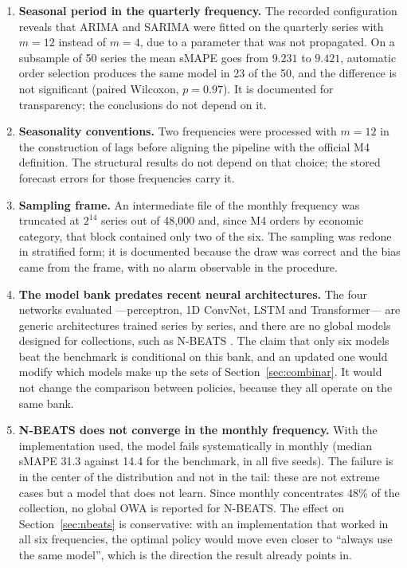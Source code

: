 \begin{enumerate}
\item \textbf{Seasonal period in the quarterly frequency.} The recorded configuration
      reveals that ARIMA and SARIMA were fitted on the quarterly series with $m=12$
      instead of $m=4$, due to a parameter that was not propagated. On a subsample of 50
      series the mean sMAPE goes from $9.231$ to $9.421$, automatic order selection
      produces the same model in 23 of the 50, and the difference is not significant
      (paired Wilcoxon, $p=0.97$). It is documented for transparency; the conclusions do
      not depend on it.

\item \textbf{Seasonality conventions.} Two frequencies were processed with $m=12$ in the
      construction of lags before aligning the pipeline with the official M4 definition.
      The structural results do not depend on that choice; the stored forecast errors for
      those frequencies carry it.

\item \textbf{Sampling frame.} An intermediate file of the monthly frequency was truncated
      at $2^{14}$ series out of 48{,}000 and, since M4 orders by economic category, that
      block contained only two of the six. The sampling was redone in stratified form; it
      is documented because the draw was correct and the bias came from the frame, with no
      alarm observable in the procedure.

\item \textbf{The model bank predates recent neural architectures.} The four networks
      evaluated ---perceptron, 1D ConvNet, LSTM and Transformer--- are generic
      architectures trained series by series, and there are no global models designed for
      collections, such as N-BEATS \cite{oreshkin2020}. The claim that only six models
      beat the benchmark is conditional on this bank, and an updated one would modify
      which models make up the sets of Section~\ref{sec:combinar}. It would not change the
      comparison between policies, because they all operate on the same bank.

\item \textbf{N-BEATS does not converge in the monthly frequency.} With the
      implementation used, the model fails systematically in monthly (median sMAPE 31.3
      against 14.4 for the benchmark, in all five seeds). The failure is in the center of
      the distribution and not in the tail: these are not extreme cases but a model that
      does not learn. Since monthly concentrates 48\% of the collection, no global OWA is
      reported for N-BEATS. The effect on Section~\ref{sec:nbeats} is conservative: with
      an implementation that worked in all six frequencies, the optimal policy would move
      even closer to ``always use the same model'', which is the direction the result
      already points in.


\end{enumerate}
